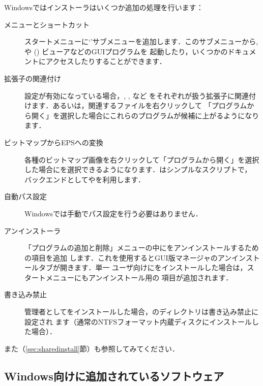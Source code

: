 \documentclass[uplatex,dvipdfmx,tombow]{jsarticle}
\begin{document}
Windowsでは\TL インストーラはいくつか追加の処理を行います：
%
\begin{description}
\item[メニューとショートカット]
スタートメニューに`\TL'サブメニューを追加します．このサブメニューから,
や () \PS ビューアなどのGUIプログラムを
起動したり，いくつかのドキュメントにアクセスしたりすることができます．

\item[拡張子の関連付け]
設定が有効になっている場合，, , など
をそれぞれが扱う拡張子に関連付けます．あるいは，関連するファイルを右クリックして
「プログラムから開く」を選択した場合にこれらのプログラムが候補に上がるようになり
ます．

\item[ビットマップからEPSへの変換]
各種のビットマップ画像を右クリックして「プログラムから開く」を選択した場合にを選択できるようになります．はシンプルなスクリプトで，
バックエンドとしてやを利用します．

\item[自動パス設定]
Windowsでは手動でパス設定を行う必要はありません．

\item[アンインストーラ]
「プログラムの追加と削除」メニューの中に\TL をアンインストールするための項目を追加
します．これを使用するとGUI版\TL マネージャのアンインストールタブが開きます．単一
ユーザ向けに\TL をインストールした場合は，スタートメニューにもアンインストール用の
項目が追加されます．

\item[書き込み禁止]
管理者として\TL をインストールした場合，\TL のディレクトリは書き込み禁止に設定され
ます（通常のNTFSフォーマット内蔵ディスクにインストールした場合）．
\end{description}

また（\ref{sec:sharedinstall}節）も参照してみてください．

\subsection{Windows向けに追加されているソフトウェア}
\end{document}
